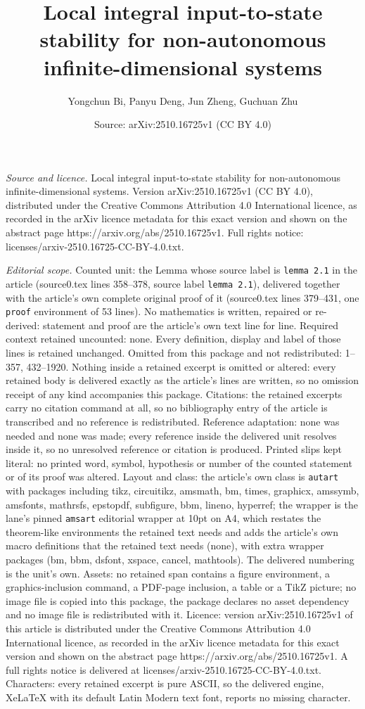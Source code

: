 \documentclass[10pt,a4paper]{amsart}
\title[Local integral input-to-state stability for non-autonomous i]{Local integral input-to-state stability for non-autonomous infinite-dimensional systems}
\author{Yongchun Bi, Panyu Deng, Jun Zheng, Guchuan Zhu}
\date{Source: arXiv:2510.16725v1 (CC BY 4.0)}
\begin{document}
\maketitle

\noindent\emph{Source and licence.} Local integral input-to-state stability for non-autonomous infinite-dimensional systems. Version arXiv:2510.16725v1 (CC BY 4.0), distributed under the Creative Commons Attribution 4.0 International licence, as recorded in the arXiv licence metadata for this exact version and shown on the abstract page https://arxiv.org/abs/2510.16725v1. Full rights notice: licenses/arxiv-2510.16725-CC-BY-4.0.txt.\par\smallskip

\noindent\textit{Editorial scope.} Counted unit: the Lemma whose source label is \texttt{lemma 2.1} in the article (source0.tex lines 358--378, source label \texttt{lemma 2.1}), delivered together with the article's own complete original proof of it (source0.tex lines 379--431, one \texttt{proof} environment of 53 lines). No mathematics is written, repaired or re-derived: statement and proof are the article's own text line for line. Required context retained uncounted: none. Every definition, display and label of those lines is retained unchanged. Omitted from this package and not redistributed: 1--357, 432--1920. Nothing inside a retained excerpt is omitted or altered: every retained body is delivered exactly as the article's lines are written, so no omission receipt of any kind accompanies this package. Citations: the retained excerpts carry no citation command at all, so no bibliography entry of the article is transcribed and no reference is redistributed. Reference adaptation: none was needed and none was made; every reference inside the delivered unit resolves inside it, so no unresolved reference or citation is produced. Printed slips kept literal: no printed word, symbol, hypothesis or number of the counted statement or of its proof was altered. Layout and class: the article's own class is \texttt{autart} with packages including tikz, circuitikz, amsmath, bm, times, graphicx, amssymb, amsfonts, mathrsfs, epstopdf, subfigure, bbm, lineno, hyperref; the wrapper is the lane's pinned \texttt{amsart} editorial wrapper at 10pt on A4, which restates the theorem-like environments the retained text needs and adds the article's own macro definitions that the retained text needs (none), with extra wrapper packages (bm, bbm, dsfont, xspace, cancel, mathtools). The delivered numbering is the unit's own. Assets: no retained span contains a figure environment, a graphics-inclusion command, a PDF-page inclusion, a table or a TikZ picture; no image file is copied into this package, the package declares no asset dependency and no image file is redistributed with it. Licence: version arXiv:2510.16725v1 of this article is distributed under the Creative Commons Attribution 4.0 International licence, as recorded in the arXiv licence metadata for this exact version and shown on the abstract page https://arxiv.org/abs/2510.16725v1. A full rights notice is delivered at licenses/arxiv-2510.16725-CC-BY-4.0.txt. Characters: every retained excerpt is pure ASCII, so the delivered engine, XeLaTeX with its default Latin Modern text font, reports no missing character.
\end{document}
